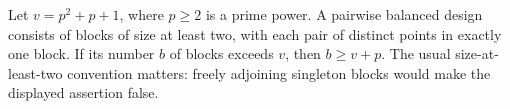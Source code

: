 Let \(v=p^2+p+1\), where \(p\geq2\) is a prime power.
A pairwise balanced design consists of blocks of size
at least two, with each pair of distinct points in exactly
one block. If its number \(b\) of blocks exceeds \(v\),
then \(b\geq v+p\).
The usual size-at-least-two convention matters: freely
adjoining singleton blocks would make the displayed
assertion false.
